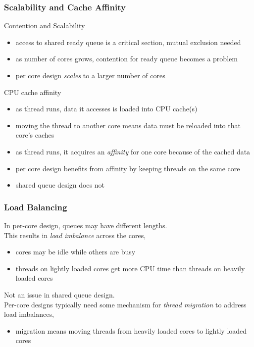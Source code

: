\documentclass[12pt]{article}
\theoremstyle{plain}
\theoremstyle{definition}
\begin{document}
\subsubsection{Scalability and Cache Affinity}
Contention and Scalability
\begin{itemize}
  \item access to shared ready queue is a critical section, mutual exclusion needed
  \item as number of cores grows, contention for ready queue becomes a problem
  \item per core design \emph{scales} to a larger number of cores
\end{itemize}

CPU cache affinity
\begin{itemize}
  \item as thread runs, data it accesses is loaded into CPU cache(s)
  \item moving the thread to another core means data must be reloaded into that core's caches
  \item as thread runs, it acquires an \emph{affinity} for one core because of the cached data
  \item per core design benefits from affinity by keeping threads on the same core
  \item shared queue design does not
\end{itemize}

\subsubsection{Load Balancing}
In per-core design, queues may have different lengths. \\
This results in \emph{load imbalance} across the cores,
\begin{itemize}
  \item cores may be idle while others are busy
  \item threads on lightly loaded cores get more CPU time than threads on heavily loaded cores
\end{itemize}

Not an issue in shared queue design. \\

Per-core designs typically need some mechanism for \emph{thread migration} to address load imbalances,
\begin{itemize}
  \item migration means moving threads from heavily loaded cores to lightly loaded cores
\end{itemize}
\end{document}

